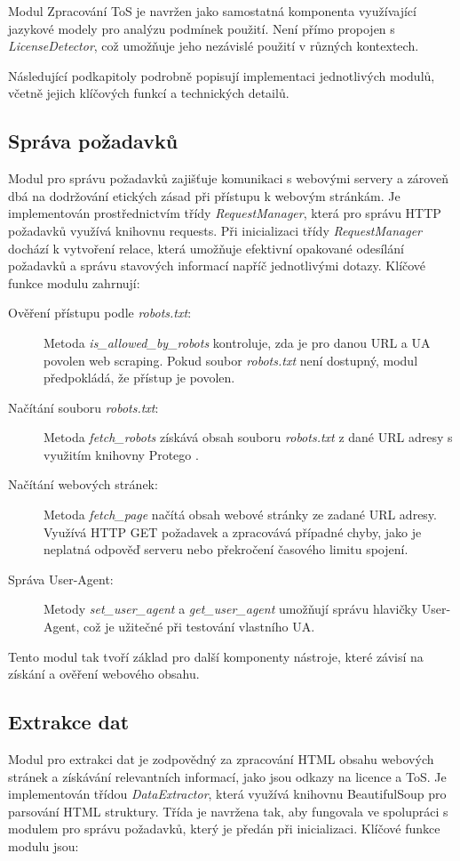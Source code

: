 Modul Zpracování ToS je navržen jako samostatná komponenta využívající jazykové modely pro analýzu podmínek použití.
Není přímo propojen s \textit{LicenseDetector}, což umožňuje jeho nezávislé použití v různých kontextech.

Následující podkapitoly podrobně popisují implementaci jednotlivých modulů, včetně jejich klíčových funkcí a technických detailů.

\subsection{Správa požadavků}
Modul pro správu požadavků zajišťuje komunikaci s webovými servery a zároveň dbá na dodržování etických zásad při přístupu k webovým stránkám.
Je implementován prostřednictvím třídy \textit{RequestManager}, která pro správu HTTP požadavků využívá knihovnu requests.
Při inicializaci třídy \textit{RequestManager} dochází k vytvoření relace, která umožňuje efektivní opakované odesílání požadavků a správu stavových informací napříč jednotlivými dotazy.
Klíčové funkce modulu zahrnují:

\begin{description}
    \item[Ověření přístupu podle \textit{robots.txt}:] Metoda \textit{is_allowed_by_robots} kontroluje, zda je pro danou URL a UA povolen web scraping. Pokud soubor \textit{robots.txt} není dostupný, modul předpokládá, že přístup je povolen.
    \item[Načítání souboru \textit{robots.txt}:] Metoda \textit{fetch_robots} získává obsah souboru \textit{robots.txt} z dané URL adresy s využitím knihovny Protego \cite{pypiClientChallenge}.
    \item[Načítání webových stránek:] Metoda \textit{fetch_page} načítá obsah webové strán\-ky ze zadané URL adresy. Využívá HTTP GET požadavek a zpracovává případné chyby, jako je neplatná odpověď serveru nebo překročení časového limitu spojení.
    \item[Správa User-Agent:] Metody \textit{set_user_agent} a \textit{get_user_agent} umožňují správu hlavičky User-Agent, což je užitečné při testování vlastního UA.
\end{description}

Tento modul tak tvoří základ pro další komponenty nástroje, které závisí na získání a ověření webového obsahu.

\subsection{Extrakce dat}
Modul pro extrakci dat je zodpovědný za zpracování HTML obsahu webových stránek a získávání relevantních informací, jako jsou odkazy na licence a ToS.
Je implementován třídou \textit{DataExtractor}, která využívá knihovnu BeautifulSoup pro parsování HTML struktury.
Třída je navržena tak, aby fungovala ve spolupráci s modulem pro správu požadavků, který je předán při inicializaci.
Klíčové funkce modulu jsou:

